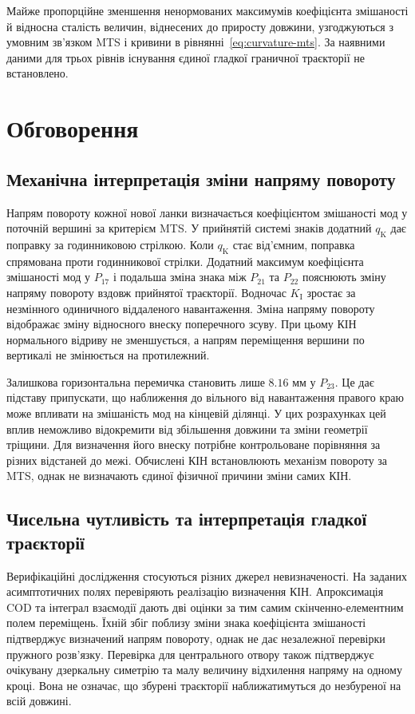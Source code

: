 \documentclass[a4paper,12pt]{article}
\newcommand{\LastLigamentMM}{8.16}
\begin{document}
\begin{samepage}
Майже пропорційне зменшення ненормованих максимумів коефіцієнта змішаності й відносна сталість
величин, віднесених до приросту довжини, узгоджуються з умовним зв’язком MTS і кривини в
рівнянні~\eqref{eq:curvature-mts}. За наявними даними для трьох рівнів існування єдиної гладкої граничної траєкторії
не встановлено.
\end{samepage}

\section{Обговорення}
\label{sec:discussion}
\subsection{Механічна інтерпретація зміни напряму повороту}
Напрям повороту кожної нової ланки визначається коефіцієнтом змішаності мод у поточній вершині
за критерієм MTS. У прийнятій системі знаків додатний $q_{\mathrm{K}}$ дає поправку за годинниковою стрілкою.
Коли $q_{\mathrm{K}}$ стає від’ємним, поправка спрямована проти годинникової стрілки. Додатний максимум
коефіцієнта змішаності мод у $P_{17}$ і подальша зміна знака між $P_{21}$ та $P_{22}$ пояснюють зміну напряму
повороту вздовж прийнятої траєкторії. Водночас $K_{\mathrm{I}}$ зростає за незмінного одиничного віддаленого
навантаження. Зміна напряму повороту відображає зміну відносного внеску поперечного зсуву. При
цьому КІН нормального відриву не зменшується, а напрям переміщення вершини по вертикалі не
змінюється на протилежний.

Залишкова горизонтальна перемичка становить лише $\LastLigamentMM$ мм у $P_{23}$. Це дає підставу припускати, що
наближення до вільного від навантаження правого краю може впливати на змішаність мод на кінцевій
ділянці. У цих розрахунках цей вплив неможливо відокремити від збільшення довжини та зміни
геометрії тріщини. Для визначення його внеску потрібне контрольоване порівняння за різних
відстаней до межі. Обчислені КІН встановлюють механізм повороту за MTS, однак не визначають
єдиної фізичної причини зміни самих КІН.

\subsection{Чисельна чутливість та інтерпретація гладкої траєкторії}
Верифікаційні дослідження стосуються різних джерел невизначеності. На заданих асимптотичних
полях перевіряють реалізацію визначення КІН. Апроксимація COD та інтеграл взаємодії дають дві
оцінки за тим самим скінченно-елементним полем переміщень. Їхній збіг поблизу зміни знака
коефіцієнта змішаності підтверджує визначений напрям повороту, однак не дає незалежної перевірки
пружного розв’язку. Перевірка для центрального отвору також підтверджує очікувану дзеркальну
симетрію та малу величину відхилення напряму на одному кроці. Вона не означає, що збурені траєкторії
наближатимуться до незбуреної на всій довжині.
\end{document}
